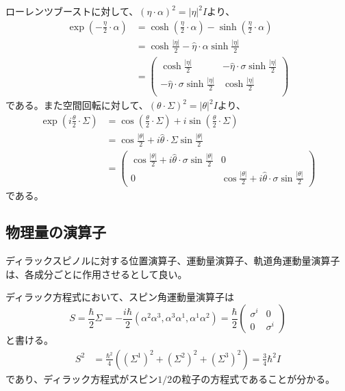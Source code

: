     ローレンツブーストに対して、$(\eta \cdot \alpha)^2 = |\eta|^2I$より、
    \begin{align*}
        \exp\left(-\frac{\eta}{2} \cdot \alpha\right)
            &= \cosh\left(\frac{\eta}{2} \cdot \alpha\right) - \sinh\left(\frac{\eta}{2} \cdot \alpha\right)\\
            &= \cosh\frac{|\eta|}{2} - \hat{\eta} \cdot \alpha \sinh\frac{|\eta|}{2}\\
            &= \begin{pmatrix}
                \cosh\frac{|\eta|}{2} & -\hat{\eta} \cdot \sigma \sinh \frac{|\eta|}{2}\\
                -\hat{\eta} \cdot \sigma \sinh\frac{|\eta|}{2} & \cosh\frac{|\eta|}{2}\\
            \end{pmatrix}
    \end{align*}
    である。また空間回転に対して、$(\theta \cdot \Sigma)^2 = |\theta|^2I$より、
    \begin{align*}
        \exp\left(i\frac{\theta}{2} \cdot \Sigma\right)
            &= \cos\left(\frac{\theta}{2} \cdot \Sigma\right) + i\sin\left(\frac{\theta}{2} \cdot \Sigma\right)\\
            &= \cos\frac{|\theta|}{2} + i\hat{\theta} \cdot \Sigma \sin\frac{|\theta|}{2}\\
            &= \begin{pmatrix}
                \cos\frac{|\theta|}{2} + i\hat{\theta} \cdot \sigma \sin\frac{|\theta|}{2} & 0\\
                0 & \cos\frac{|\theta|}{2} + i\hat{\theta} \cdot \sigma \sin\frac{|\theta|}{2}
            \end{pmatrix}
    \end{align*}
    である。

\subsection{物理量の演算子}
    ディラックスピノルに対する位置演算子、運動量演算子、軌道角運動量演算子は、各成分ごとに作用させるとして良い。
    
    ディラック方程式において、スピン角運動量演算子は
        \[S = \frac{\hbar}{2}\Sigma = -\frac{i\hbar}{2}(\alpha^2\alpha^3, \alpha^3\alpha^1, \alpha^1\alpha^2) = \frac{\hbar}{2}\begin{pmatrix}
            \sigma^i & 0\\
            0 & \sigma^i
        \end{pmatrix}\]
    と書ける。
    \begin{align*}
        S^2 &= \frac{\hbar^2}{4}((\Sigma^1)^2 + (\Sigma^2)^2 + (\Sigma^3)^2) = \frac{3}{4}\hbar^2I
    \end{align*}
    であり、ディラック方程式がスピン$1/2$の粒子の方程式であることが分かる。
    
